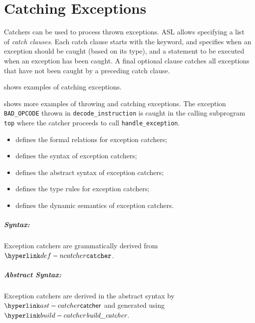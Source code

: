 \chapter{Catching Exceptions\label{chap:CatchingExceptions}}

Catchers can be used to process thrown exceptions.
ASL allows specifying a list of \emph{catch clauses}.
Each catch clause starts with the \Twhen{} keyword,
and specifies when an exception
should be caught (based on its type), and a statement to be executed
when an exception has been caught.
A final optional \Totherwise{} clause
catches all exceptions that have not been caught
by a preceding catch clause.

 shows examples of catching exceptions.

 shows more examples of throwing and catching exceptions.
The exception \verb|BAD_OPCODE| thrown in \verb|decode_instruction| is caught in the calling
subprogram \verb|top| where the catcher proceeds to call \verb|handle_exception|.

\ChapterOutline
\begin{itemize}
  \item {} defines the formal relations for exception catchers;
  \item {} defines the syntax of exception catchers;
  \item {} defines the abstract syntax of exception catchers;
  \item {} defines the type rules for exception catchers;
  \item {} defines the dynamic semantics of exception catchers.
\end{itemize}

\paragraph{Syntax:} Exception catchers are grammatically derived from $\Ncatcher$.
\paragraph{Abstract Syntax:} Exception catchers are derived in the abstract syntax by $\catcher$
  and generated using $\buildcatcher$.
